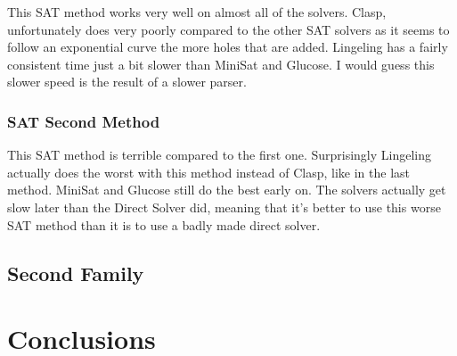\documentclass[11pt]{article} %
\begin{document}
This SAT method works very well on almost all of the solvers. Clasp, unfortunately does very poorly compared to the other SAT solvers as it seems to follow an exponential curve the more holes that are added. Lingeling has a fairly consistent time just a bit slower than MiniSat and Glucose. I would guess this slower speed is the result of a slower parser.

\subsubsection{SAT Second Method}

This SAT method is terrible compared to the first one. Surprisingly Lingeling actually does the worst with this method instead of Clasp, like in the last method. MiniSat and Glucose still do the best early on. The solvers actually get slow later than the Direct Solver did, meaning that it's better to use this worse SAT method than it is to use a badly made direct solver.

\subsection{Second Family}

\section{Conclusions}
\end{document}
